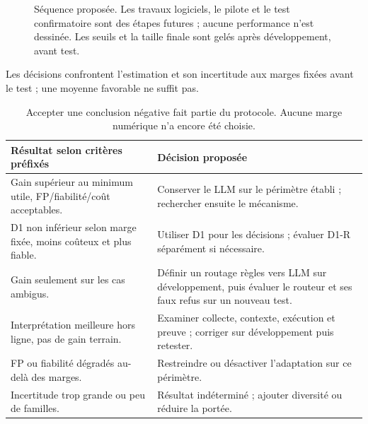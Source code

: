 \documentclass[11pt,a4paper]{article}
\begin{document}
\begin{figure}[htbp]\centering
{}
\caption{Séquence proposée. Les travaux logiciels, le pilote et le test confirmatoire sont des étapes futures ; aucune performance n'est dessinée. Les seuils et la taille finale sont gelés après développement, avant test.}\label{fig:workplan}
\end{figure}

\begin{samepage}
Les décisions confrontent l'estimation et son incertitude aux marges fixées
avant le test ; une moyenne favorable ne suffit pas.
\par\end{samepage}

\begin{table}[htbp]\centering\small
\noindent\begin{tabularx}{\linewidth}{@{}YY@{}}\toprule
Résultat selon critères préfixés & Décision proposée \\\midrule
Gain supérieur au minimum utile, FP/fiabilité/coût acceptables. & Conserver le LLM sur le périmètre établi ; rechercher ensuite le mécanisme. \\
D1 non inférieur selon marge fixée, moins coûteux et plus fiable. & Utiliser D1 pour les décisions ; évaluer D1-R séparément si nécessaire. \\
Gain seulement sur les cas ambigus. & Définir un routage règles vers LLM sur développement, puis évaluer le routeur et ses faux refus sur un nouveau test. \\
Interprétation meilleure hors ligne, pas de gain terrain. & Examiner collecte, contexte, exécution et preuve ; corriger sur développement puis retester. \\
FP ou fiabilité dégradés au-delà des marges. & Restreindre ou désactiver l'adaptation sur ce périmètre. \\
Incertitude trop grande ou peu de familles. & Résultat indéterminé ; ajouter diversité ou réduire la portée. \\\bottomrule
\end{tabularx}
\caption{Accepter une conclusion négative fait partie du protocole. Aucune marge numérique n'a encore été choisie.}\label{tab:decisions}
\end{table}
\end{document}
